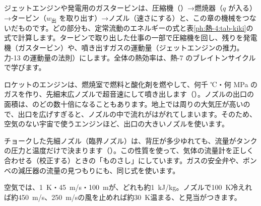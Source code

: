 \begin{phkougaku}
ジェットエンジンや発電用のガスタービンは、圧縮機（）→燃焼器（$q$ が入る）→タービン（$w_{\text{出}}$ を取り出す）→ノズル（速さにする）と、この章の機械をつないだものです。どの部分も、定常流動のエネルギーの式と表\ref{ph:熱-4:tab-kiki}の式で計算します。タービンで取り出した仕事の一部で圧縮機を回し、残りを発電機（ガスタービン）や、噴き出すガスの運動量（ジェットエンジンの推力。力-13 の運動量の法則）にします。全体の熱効率は、熱-7 のブレイトンサイクルで学びます。

ロケットのエンジンは、燃焼室で燃料と酸化剤を燃やして、何千 ℃・何 MPa のガスを作り、先細末広ノズルで超音速にして噴き出します（）。ノズルの出口の面積は、のどの数十倍になることもあります。地上では周りの大気圧が高いので、出口を広げすぎると、ノズルの中で流れがはがれてしまいます。そのため、空気のない宇宙で使うエンジンほど、出口の大きいノズルを使います。

チョークした先細ノズル（臨界ノズル）は、背圧が多少ゆれても、流量がタンクの圧力と温度だけで決まります（）。この性質を使って、気体の流量計を正しく合わせる（校正する）ときの「ものさし」にしています。ガスの安全弁や、ボンベの減圧器の流量の見つもりにも、同じ式を使います。

\begin{phketa}[流れる気体の速さと温度]
空気では、\qty{1}{K}・\qty{45}{m/s}・\qty{100}{m}が、どれも約\qty{1}{kJ/kg}。ノズルで\qty{100}{K}冷えれば約\qty{450}{m/s}、\qty{250}{m/s}の風を止めれば約\qty{30}{K}温まる、と見当がつきます。
\end{phketa}
\end{phkougaku}

